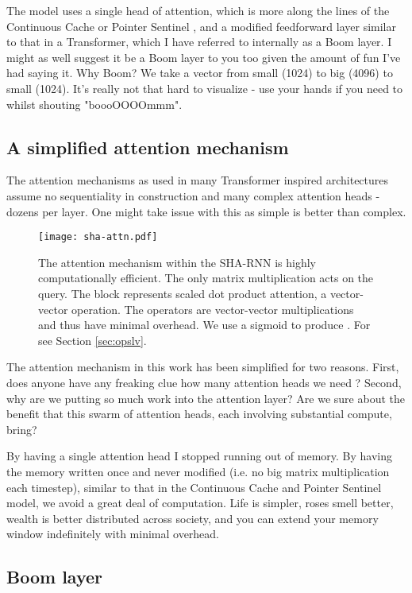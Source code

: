 \documentclass{article}
\begin{document}
The model uses a single head of attention, which is more along the lines of the Continuous Cache \citep{Grave2016} or Pointer Sentinel \citep{Merity2016}, and a modified feedforward layer similar to that in a Transformer, which I have referred to internally as a Boom layer.
I might as well suggest it be a Boom layer to you too given the amount of fun I've had saying it.
Why Boom?
We take a vector from small (1024) to big (4096) to small (1024).
It's really not that hard to visualize - use your hands if you need to whilst shouting "boooOOOOmmm".

\subsection{A simplified attention mechanism}

The attention mechanisms as used in many Transformer inspired architectures assume no sequentiality in construction and many complex attention heads - dozens per layer.
One might take issue with this as simple is better than complex.


\begin{figure}[t]
 \centering 
 \texttt{[image: sha-attn.pdf]}
\caption{
The attention mechanism within the SHA-RNN is highly computationally efficient.
The only matrix multiplication acts on the query.
The  block represents scaled dot product attention, a vector-vector operation.
The operators  are vector-vector multiplications and thus have minimal overhead.
We use a sigmoid to produce .
For  see Section \ref{sec:opslv}.
}
\label{fig:attn}
\end{figure}

The attention mechanism in this work has been simplified for two reasons.
First, does anyone have any freaking clue how many attention heads we need \cite{shazeer2019fast}?
Second, why are we putting so much work into the attention layer?
Are we sure about the benefit that this swarm of attention heads, each involving substantial compute, bring?

By having a single attention head I stopped running out of memory.
By having the memory written once and never modified (i.e. no big matrix multiplication each timestep), similar to that in the Continuous Cache and Pointer Sentinel model, we avoid a great deal of computation.
Life is simpler, roses smell better, wealth is better distributed across society, and you can extend your memory window indefinitely with minimal overhead.

\subsection{Boom layer}
\end{document}
